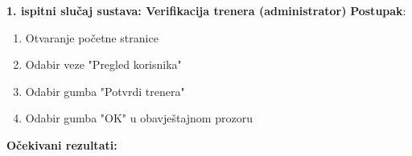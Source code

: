 
            \noindent \textbf{1. ispitni slučaj sustava: Verifikacija trenera (administrator)}
            \newline \textbf{Postupak}:
            \begin{enumerate}
                
            \item Otvaranje početne stranice

            \item Odabir veze "Pregled korisnika"

            \item Odabir gumba "Potvrdi trenera"

            \item Odabir gumba "OK" u obavještajnom prozoru

            \end{enumerate}
            \textbf{Očekivani rezultati:}
            

